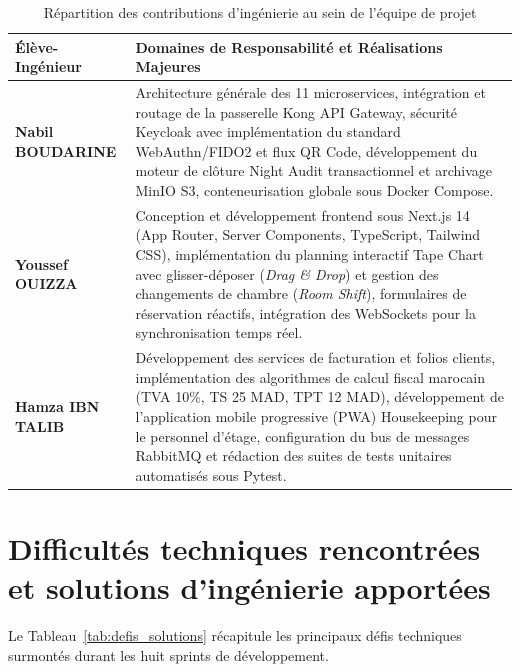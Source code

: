 \begin{table}[H]
\centering
\small
\renewcommand{\arraystretch}{1.3}
\begin{tabularx}{\textwidth}{|p{3.5cm}|X|}
\hline
\textbf{Élève-Ingénieur} & \textbf{Domaines de Responsabilité et Réalisations Majeures} \\
\hline
\textbf{Nabil BOUDARINE} & Architecture générale des 11 microservices, intégration et routage de la passerelle Kong API Gateway, sécurité Keycloak avec implémentation du standard WebAuthn/FIDO2 et flux QR Code, développement du moteur de clôture Night Audit transactionnel et archivage MinIO S3, conteneurisation globale sous Docker Compose. \\
\hline
\textbf{Youssef OUIZZA} & Conception et développement frontend sous Next.js 14 (App Router, Server Components, TypeScript, Tailwind CSS), implémentation du planning interactif Tape Chart avec glisser-déposer (\textit{Drag \& Drop}) et gestion des changements de chambre (\textit{Room Shift}), formulaires de réservation réactifs, intégration des WebSockets pour la synchronisation temps réel. \\
\hline
\textbf{Hamza IBN TALIB} & Développement des services de facturation et folios clients, implémentation des algorithmes de calcul fiscal marocain (TVA 10\%, TS 25 MAD, TPT 12 MAD), développement de l'application mobile progressive (PWA) Housekeeping pour le personnel d'étage, configuration du bus de messages RabbitMQ et rédaction des suites de tests unitaires automatisés sous Pytest. \\
\hline
\end{tabularx}
\caption{Répartition des contributions d'ingénierie au sein de l'équipe de projet}
\label{tab:contributions_detail}
\end{table}

\section{Difficultés techniques rencontrées et solutions d'ingénierie apportées}

Le Tableau~\ref{tab:defis_solutions} récapitule les principaux défis techniques surmontés durant les huit sprints de développement.

